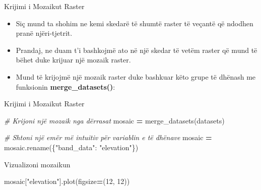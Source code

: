 \documentclass[
  ignorenonframetext,
]{beamer}
\newenvironment{Shaded}{\begin{snugshade}}{\end{snugshade}}
\newcommand{\CommentTok}[1]{\textcolor[rgb]{0.56,0.35,0.01}{\textit{#1}}}
\newcommand{\DecValTok}[1]{\textcolor[rgb]{0.00,0.00,0.81}{#1}}
\newcommand{\NormalTok}[1]{#1}
\newcommand{\OperatorTok}[1]{\textcolor[rgb]{0.81,0.36,0.00}{\textbf{#1}}}
\newcommand{\StringTok}[1]{\textcolor[rgb]{0.31,0.60,0.02}{#1}}
\begin{document}
\begin{frame}{Krijimi i Mozaikut Raster}
\protect\hypertarget{krijimi-i-mozaikut-raster}{}
\begin{itemize}
\item
  Siç mund ta shohim ne kemi skedarë të shumtë raster të veçantë që
  ndodhen pranë njëri-tjetrit.
\item
  Prandaj, ne duam t'i bashkojmë ato në një skedar të vetëm raster që
  mund të bëhet duke krijuar një mozaik raster.
\item
  Mund të krijojmë një mozaik raster duke bashkuar këto grupe të dhënash
  me funksionin \textbf{merge\_datasets()}:
\end{itemize}
\end{frame}

\begin{frame}[fragile]{Krijimi i Mozaikut Raster}
\protect\hypertarget{krijimi-i-mozaikut-raster-1}{}

\begin{Shaded}
\begin{Highlighting}[]
\CommentTok{\# Krijoni një mozaik nga dërrasat}
\NormalTok{mosaic }\OperatorTok{=}\NormalTok{ merge\_datasets(datasets)}

\CommentTok{\# Shtoni një emër më intuitiv për variablin e të dhënave}
\NormalTok{mosaic }\OperatorTok{=}\NormalTok{ mosaic.rename(\{}\StringTok{"band\_data"}\NormalTok{: }\StringTok{"elevation"}\NormalTok{\})}
\end{Highlighting}
\end{Shaded}
\end{frame}

\begin{frame}[fragile]{Vizualizoni mozaikun}
\protect\hypertarget{vizualizoni-mozaikun}{}

\begin{Shaded}
\begin{Highlighting}[]
\NormalTok{mosaic[}\StringTok{"elevation"}\NormalTok{].plot(figsize}\OperatorTok{=}\NormalTok{(}\DecValTok{12}\NormalTok{, }\DecValTok{12}\NormalTok{))}
\end{Highlighting}
\end{Shaded}
\end{frame}
\end{document}
